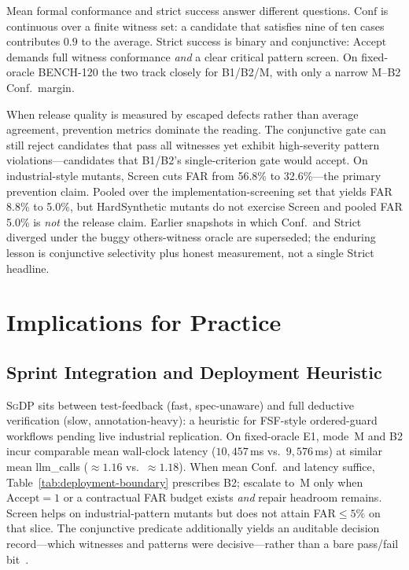 Mean formal conformance and strict success answer different questions.
$\mathrm{Conf}$ is continuous over a finite witness set: a candidate that
satisfies nine of ten cases contributes $0.9$ to the average.
Strict success is binary and conjunctive: $\mathrm{Accept}$ demands full
witness conformance \emph{and} a clear critical pattern screen.
On fixed-oracle BENCH-120 the two track closely for B1/B2/M, with only a
narrow M--B2 Conf.\ margin.

When release quality is measured by escaped defects rather than average
agreement, prevention metrics dominate the reading.
The conjunctive gate can still reject candidates that pass all witnesses yet
exhibit high-severity pattern violations---candidates that B1/B2's
single-criterion gate would accept.
On industrial-style mutants, Screen cuts FAR from 56.8\% to 32.6\%---the
primary prevention claim.
Pooled over the implementation-screening set that yields FAR 8.8\% to 5.0\%,
but HardSynthetic mutants do not exercise Screen and pooled FAR 5.0\% is
\emph{not} the release claim.
Earlier snapshots in which Conf.\ and Strict diverged under the buggy
others-witness oracle are superseded; the enduring lesson is conjunctive
selectivity plus honest measurement, not a single Strict headline.


\section{Implications for Practice}
\label{sec:disc:implications}

\subsection{Sprint Integration and Deployment Heuristic}

\textsc{SgDP} sits between test-feedback (fast, spec-unaware) and full
deductive verification (slow, annotation-heavy): a heuristic for FSF-style
ordered-guard workflows pending live industrial replication.
On fixed-oracle E1, mode~M and B2 incur comparable mean wall-clock latency
($10{,}457$\,ms vs.\ $9{,}576$\,ms) at similar mean llm\_calls
(${\approx}1.16$ vs.\ ${\approx}1.18$).
When mean Conf.\ and latency suffice, Table~\ref{tab:deployment-boundary}
prescribes B2; escalate to~M only when $\mathrm{Accept}{=}1$ or a contractual
FAR budget exists \emph{and} repair headroom remains.
Screen helps on industrial-pattern mutants but does not attain FAR${\le}5\%$
on that slice.
The conjunctive predicate additionally yields an auditable decision
record---which witnesses and patterns were decisive---rather than a bare
pass/fail bit~\citep{harman2004maff,beck2004xp}.

